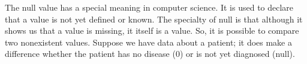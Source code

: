 
The null value has a special meaning in computer science. It is used to declare that a value is not yet defined or known.
The specialty of null is that although it shows us that a value is missing, it itself is a value. So, it is possible to compare two
nonexistent values. Suppose we have data about a patient;
it does make a difference whether the patient has no disease (0) or is not yet diagnosed (null).

